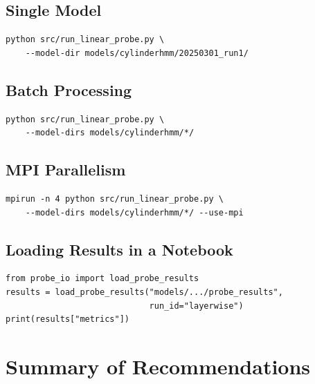 \documentclass[11pt]{article}
\begin{document}
\subsection{Single Model}

\begin{verbatim}
python src/run_linear_probe.py \
    --model-dir models/cylinderhmm/20250301_run1/
\end{verbatim}

\subsection{Batch Processing}

\begin{verbatim}
python src/run_linear_probe.py \
    --model-dirs models/cylinderhmm/*/
\end{verbatim}

\subsection{MPI Parallelism}

\begin{verbatim}
mpirun -n 4 python src/run_linear_probe.py \
    --model-dirs models/cylinderhmm/*/ --use-mpi
\end{verbatim}

\subsection{Loading Results in a Notebook}

\begin{verbatim}
from probe_io import load_probe_results
results = load_probe_results("models/.../probe_results",
                             run_id="layerwise")
print(results["metrics"])
\end{verbatim}

\section{Summary of Recommendations}
\end{document}
